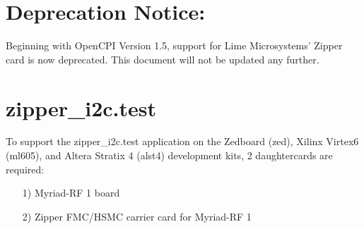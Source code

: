 \documentclass{article}
\begin{document}
\section*{Deprecation Notice:}
Beginning with OpenCPI Version 1.5, support for Lime Microsystems' Zipper card is now deprecated. This document will not be updated any further.
\section*{zipper\_i2c.test}
To support the zipper\_i2c.test application on the Zedboard (zed), Xilinx Virtex6 (ml605), and Altera Stratix 4 (alst4) development kits, 2 daughtercards are required:\par
	\begin{itemize}
	\item[1)] Myriad-RF 1 board
	\item[2)] Zipper FMC/HSMC carrier card for Myriad-RF 1
	\end{itemize}
\end{document}
